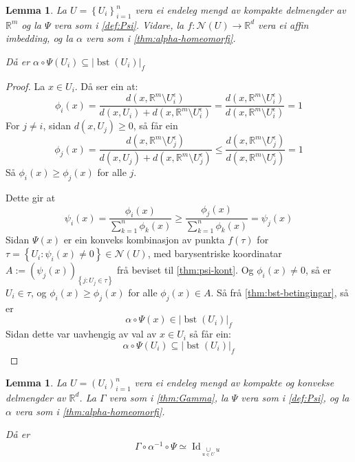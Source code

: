 \documentclass[a4paper, 12pt, norsk]{article}
\theoremstyle{plain}
\newtheorem{lemma}[theorem]{Lemma}
\theoremstyle{definition}
\newcommand{\Rb}{\mathbb{R}}
\newcommand{\Nc}{\mathcal{N}}
\newcommand{\union}{ \mathop{\cup}\limits }
\newcommand{\gr}[1]{ \lvert #1 \rvert } %
\newcommand{\set}[1]{ \left\{ #1 \right\} } %
\newcommand{\tuple}[1]{ \left( #1 \right) } %
\DeclareMathOperator{\bst}{bst} %
\DeclareMathOperator{\Id}{Id} %
\begin{document}
\begin{lemma} \label{thm:Psi-inni-bst}
	La \( U = \set{U_i}_{i=1}^n \) vera ei endeleg mengd av kompakte delmengder av \( \Rb^m \) og la \( \Psi \) vera som i \autoref{def:Psi}. Vidare, la \( f: \Nc(U) \to \Rb^d \) vera ei affin imbedding, og la \( \alpha \) vera som i \autoref{thm:alpha-homeomorfi}.

	Då er \( \alpha \circ \Psi(U_i) \subseteq \gr{\bst(U_i)}_f \)
\end{lemma}

\begin{proof}
	La \( x \in U_i \). Då ser ein at:
	\[
		\phi_i(x) = \frac{d(x, \Rb^m \setminus U_i^\epsilon)}{d(x, U_i) + d(x, \Rb^m \setminus U_i^\epsilon)} = \frac{d(x, \Rb^m \setminus U_i^\epsilon)}{d(x, \Rb^m \setminus U_i^\epsilon)} = 1
	\] 
	For \( j \neq i \), sidan \( d(x, U_j) \geq 0 \), så får ein
	\[
		\phi_j(x) = \frac{d(x, \Rb^m \setminus U_j^\epsilon)}{d(x, U_j) + d(x, \Rb^m \setminus U_j^\epsilon)} \leq \frac{d(x, \Rb^m \setminus U_j^\epsilon)}{d(x, \Rb^m \setminus U_j^\epsilon)} = 1
	\]
	Så \( \phi_i(x) \geq \phi_j(x) \) for alle \( j \).

	Dette gir at
	\[
		\psi_i(x) = \frac{\phi_i(x)}{\sum_{k=1}^n \phi_k(x)} \geq \frac{\phi_j(x)}{\sum_{k=1}^n \phi_k(x)} = \psi_j(x)
	\]
	Sidan \( \Psi(x) \) er ein konveks kombinasjon av punkta \( f(\tau) \) for \( \tau = \set{U_i : \psi_i(x) \neq 0} \in \Nc(U) \), med barysentriske koordinatar \( A:= \tuple{\psi_j(x)}_{\set{ j : U_j\in \tau}} \) frå beviset til \autoref{thm:psi-kont}. Og \( \phi_i(x) \neq 0 \), så er \( U_i \in \tau \), og \( \phi_i(x) \geq \phi_j(x) \) for alle \( \phi_j(x) \in A \). Så frå \autoref{thm:bst-betingingar}, så er
	\[
		\alpha \circ \Psi(x) \in \gr{\bst(U_i)}_f
	\]
	Sidan dette var uavhengig av val av \( x \in U_i \) så får ein:
	\[
		\alpha \circ \Psi(U_i) \subseteq \gr{\bst(U_i)}_f
	\]
\end{proof}

\begin{lemma} \label{thm:homeq-u}
	La \( U = \tuple{U_i}_{i=1}^n \) vera ei endeleg mengd av kompakte og konvekse delmengder av \( \Rb^d \). La \( \Gamma \) vera som i \autoref{thm:Gamma}, la \( \Psi \) vera som i \autoref{def:Psi}, og la \( \alpha \) vera som i \autoref{thm:alpha-homeomorfi}. 
	
	Då er
	\[
		\Gamma \circ \alpha^{-1} \circ \Psi \simeq \Id_{\union_{u \in U} u} 
	\]
\end{lemma}
\end{document}
